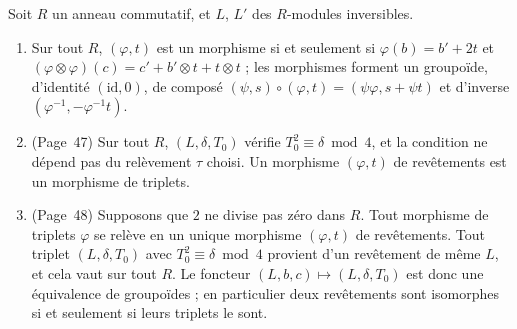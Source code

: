 \begin{encadre}
\begin{theoreme}
Soit $R$ un anneau commutatif, et $L$, $L'$ des $R$-modules inversibles.
\begin{enumerate}
\item Sur tout $R$, $(\varphi, t)$ est un morphisme si et seulement si $\varphi(b) = b' + 2t$ et $(\varphi \otimes \varphi)(c) = c' + b' \otimes t + t \otimes t$ ; les morphismes forment un groupoïde, d'identité $(\mathrm{id}, 0)$, de composé $(\psi, s) \circ (\varphi, t) = (\psi\varphi, s + \psi t)$ et d'inverse $(\varphi^{-1}, -\varphi^{-1}t)$.
\item (Page~47) Sur tout $R$, $(L, \delta, T_0)$ vérifie $T_0^2 \equiv \delta \bmod 4$, et la condition ne dépend pas du relèvement $\tau$ choisi. Un morphisme $(\varphi, t)$ de revêtements est un morphisme de triplets.
\item (Page~48) Supposons que $2$ ne divise pas zéro dans $R$. Tout morphisme de triplets $\varphi$ se relève en un unique morphisme $(\varphi, t)$ de revêtements. Tout triplet $(L, \delta, T_0)$ avec $T_0^2 \equiv \delta \bmod 4$ provient d'un revêtement de même $L$, et cela vaut sur tout $R$. Le foncteur $(L, b, c) \mapsto (L, \delta, T_0)$ est donc une équivalence de groupoïdes ; en particulier deux revêtements sont isomorphes si et seulement si leurs triplets le sont.
\end{enumerate}
\end{theoreme}
\end{encadre}

